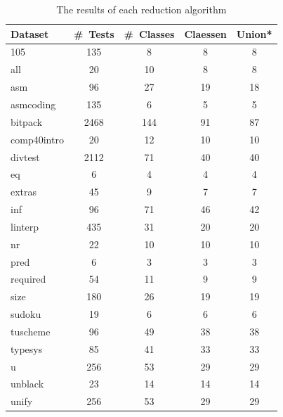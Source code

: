 \documentclass[svgnames]{beamer}
\theoremstyle{definition}
\begin{document}
\begin{frame}
\begin{table}[t]
\def\?{\phantom0}
\centering

\begin{tabular}{ | l | c | c | c | c | }
\hline
Dataset & \#~Tests & \#\ Classes &  Claessen &  Union*  \\ 
\hline
105 & \?135 & \?\?8 & \?8 & \?8 \\
all & \?\?20 & \?10 & \?8 & \?8 \\
asm & \?\?96 & \?27 & 19 & 18 \\
asmcoding & \?135 & \?\?6 & \?5 & \?5 \\
bitpack & 2468 & 144 & 91 & 87 \\
comp40intro & \?\?20 & \?12 & 10 & 10 \\
divtest & 2112 & \?71 & 40 & 40 \\
eq & \?\?\?6 & \?\?4 & \?4 & \?\?4 \\
extras & \?\?45 & \?\?9 & \?7 & \?7 \\
inf & \?\?96 & \?71 & 46 & 42 \\
linterp & \?435 & \?31 & 20 & 20 \\
nr & \?\?22 & \?10 & 10 & 10 \\
pred & \?\?\?6 & \?\?3 & \?3 & \?3 \\
required & \?\?54 & \?11 & \?9 & \?9 \\
size & \?180 & \?26 & 19 & 19 \\
sudoku & \?19 & \?\?6 & \?6 & \?6 \\
tuscheme & \?\?96 & \?49 & 38 & 38 \\
typesys & \?\?85 & \?41 & 33 & 33 \\
u & \?256 & \?53 & 29 & 29 \\
unblack & \?23 & \?14 & 14 & 14 \\
unify & \?256 & \?53 & 29 & 29 \\
\hline
\end{tabular}
\caption{The results of each reduction algorithm}
\end{table}
\end{frame}
\end{document}
